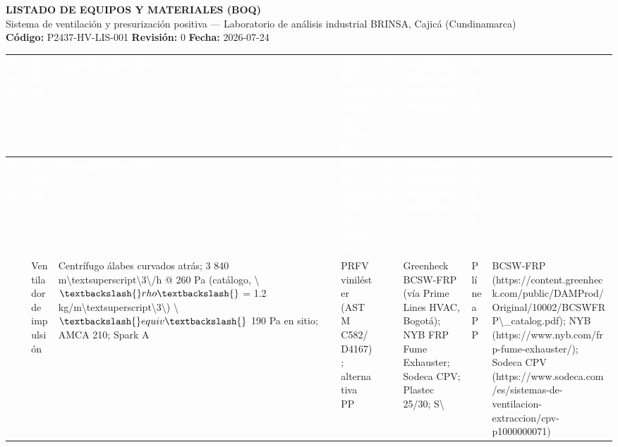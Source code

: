 \documentclass[11pt,a4paper,landscape]{article}
\begin{document}
\begin{center}
{\Large\bfseries LISTADO DE EQUIPOS Y MATERIALES (BOQ)}\\[0.3em]
{\large Sistema de ventilación y presurización positiva — Laboratorio de análisis industrial BRINSA, Cajicá (Cundinamarca)}\\[0.5em]
\textbf{C\'{o}digo:} P2437-HV-LIS-001 \quad \textbf{Revisi\'{o}n:} 0 \quad \textbf{Fecha:} 2026-07-24
\end{center}

\vspace{0.5cm}

\renewcommand{\arraystretch}{1.3}
\begin{longtable}{|
    >{\centering\arraybackslash}p{0.6cm}|
    >{\raggedright\arraybackslash}p{2.2cm}|
    >{\raggedright\arraybackslash}p{4.5cm}|
    >{\raggedright\arraybackslash}p{3.2cm}|
    >{\centering\arraybackslash}p{1.0cm}|
    >{\raggedright\arraybackslash}p{4.5cm}|
    >{\raggedright\arraybackslash}p{4.5cm}|
}
\hline
{}
\textcolor{white}{\textbf{Ítem}} &
\textcolor{white}{\textbf{Función}} &
\textcolor{white}{\textbf{Especificación clave}} &
\textcolor{white}{\textbf{Material / compatibilidad corrosiva}} &
\textcolor{white}{\textbf{Cant.}} &
\textcolor{white}{\textbf{Candidatos comerciales (fabricante/modelo)}} &
\textcolor{white}{\textbf{Fuente}} \\
\hline
\endfirsthead
\hline
{}
\textcolor{white}{\textbf{Ítem}} &
\textcolor{white}{\textbf{Función}} &
\textcolor{white}{\textbf{Especificación clave}} &
\textcolor{white}{\textbf{Material / compatibilidad corrosiva}} &
\textcolor{white}{\textbf{Cant.}} &
\textcolor{white}{\textbf{Candidatos comerciales (fabricante/modelo)}} &
\textcolor{white}{\textbf{Fuente}} \\
\hline
\endhead
{} & Ventilador de impulsión & Centrífugo álabes curvados atrás; 3 840 m\textbackslash{}textsuperscript\textbackslash{}{3\textbackslash{}}/h @ 260 Pa (catálogo, \textbackslash{}$\textbackslash{}rho\textbackslash{}$ = 1.2 kg/m\textbackslash{}textsuperscript\textbackslash{}{3\textbackslash{}}) \textbackslash{}$\textbackslash{}equiv\textbackslash{}$ 190 Pa en sitio; AMCA 210; Spark A & PRFV viniléster (ASTM C582/D4167); alternativa PP & 1 & Greenheck BCSW-FRP (vía Prime Lines HVAC, Bogotá); NYB FRP Fume Exhauster; Sodeca CPV; Plastec 25/30; S\textbackslash{}&P línea PP & BCSW-FRP (https://content.greenheck.com/public/DAMProd/Original/10002/BCSWFRP\textbackslash{}_catalog.pdf); NYB (https://www.nyb.com/frp-fume-exhauster/); Sodeca CPV (https://www.sodeca.com/es/sistemas-de-ventilacion-extraccion/cpv-p1000000071) \\

\end{longtable}
\end{document}
